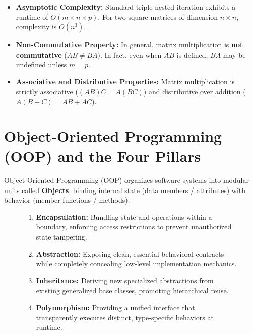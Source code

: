 \begin{keyconcept}
\begin{itemize}[leftmargin=*]
    \item \textbf{Asymptotic Complexity:} Standard triple-nested iteration exhibits a runtime of $O(m \times n \times p)$. For two square matrices of dimension $n \times n$, complexity is $O(n^3)$.
    \item \textbf{Non-Commutative Property:} In general, matrix multiplication is \textbf{not commutative} ($AB \ne BA$). In fact, even when $AB$ is defined, $BA$ may be undefined unless $m = p$.
    \item \textbf{Associative and Distributive Properties:} Matrix multiplication is strictly associative ($(AB)C = A(BC)$) and distributive over addition ($A(B + C) = AB + AC$).
\end{itemize}
\end{keyconcept}

\section{Object-Oriented Programming (OOP) and the Four Pillars}
\label{sec:oop_four_pillars}

Object-Oriented Programming (OOP) organizes software systems into modular units called \textbf{Objects}, binding internal state (data members / attributes) with behavior (member functions / methods).

\begin{figure}[htbp]
\centering
\begin{tcolorbox}[colback=blockbg,colframe=primary,title=\textbf{The Four Foundational Pillars of Object-Oriented Architecture}]
\begin{enumerate}[leftmargin=*]
    \item \textbf{Encapsulation:} Bundling state and operations within a boundary, enforcing access restrictions to prevent unauthorized state tampering.
    \item \textbf{Abstraction:} Exposing clean, essential behavioral contracts while completely concealing low-level implementation mechanics.
    \item \textbf{Inheritance:} Deriving new specialized abstractions from existing generalized base classes, promoting hierarchical reuse.
    \item \textbf{Polymorphism:} Providing a unified interface that transparently executes distinct, type-specific behaviors at runtime.
\end{enumerate}
\end{tcolorbox}
\end{figure}

